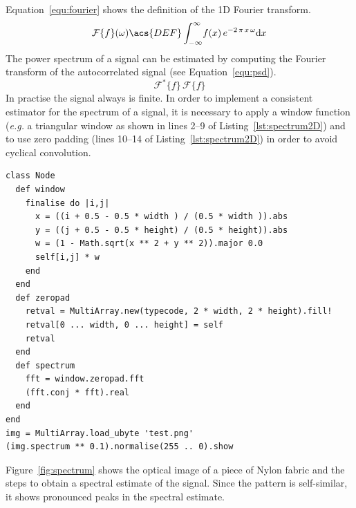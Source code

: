 \documentclass[12pt,a4paper,oneside,openright]{book}
\newcommand{\eg}{\emph{e.g.} }
\newcommand{\equ}[1]{Equation~\ref{equ:#1}}
\newcommand{\fig}[1]{Figure~\ref{fig:#1}}
\newcommand{\lst}[1]{Listing~\ref{lst:#1}}
\begin{document}
\begin{CJK}{UTF8}{}
\equ{fourier} shows the definition of the \ac{1D} Fourier transform.
\begin{equation}\label{equ:fourier}
  \mathcal{F}\{f\}(\omega)\acs{DEF}\int_{-\infty}^\infty\! f(x)\,e^{-2\,\pi\,x\,\omega}\mathrm{d}x
\end{equation}
The power spectrum of a signal can be estimated by computing the Fourier transform of the autocorrelated signal (see \equ{psd}).
\begin{equation}\label{equ:psd}
  \mathcal{F}^\ast\{f\}\,\mathcal{F}\{f\}
\end{equation}
In practise the signal always is finite. In order to implement a consistent estimator for the spectrum of a signal, it is necessary to apply a window function (\eg a triangular window as shown in lines 2--9 of \lst{spectrum2D}) and to use zero padding (lines 10--14 of \lst{spectrum2D}) in order to avoid cyclical convolution.
\lstset{language=Ruby,frame=single,numbers=left}
\begin{lstlisting}[float,caption={Estimating the spectrum of a 2D signal},escapechar=\$,label=lst:spectrum2D]
class Node
  def window
    finalise do |i,j|
      x = ((i + 0.5 - 0.5 * width ) / (0.5 * width )).abs
      y = ((j + 0.5 - 0.5 * height) / (0.5 * height)).abs
      w = (1 - Math.sqrt(x ** 2 + y ** 2)).major 0.0
      self[i,j] * w
    end
  end
  def zeropad
    retval = MultiArray.new(typecode, 2 * width, 2 * height).fill!
    retval[0 ... width, 0 ... height] = self
    retval
  end
  def spectrum
    fft = window.zeropad.fft
    (fft.conj * fft).real
  end
end
img = MultiArray.load_ubyte 'test.png'
(img.spectrum ** 0.1).normalise(255 .. 0).show
\end{lstlisting}
\fig{spectrum} shows the optical image of a piece of Nylon fabric and the steps to obtain a spectral estimate of the signal. Since the pattern is self-similar, it shows pronounced peaks in the spectral estimate.
\begin{figure}[htbp]
   \begin{center}
     \begin{minipage}[t]{.48\textwidth}
       \begin{center}
         \\

\end{center}
\end{minipage}
\end{center}
\end{figure}
\end{CJK}
\end{document}
